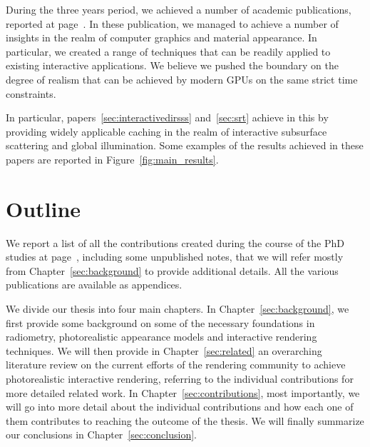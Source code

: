During the three years period, we achieved a number of academic publications, reported at page~\pageref{sec:contributionlist}. In these publication, we managed to achieve a number of insights in the realm of computer graphics and material appearance. In particular, we created a range of techniques that can be readily applied to existing interactive applications. We believe we pushed the boundary on the degree of realism that can be achieved by modern GPUs on the same strict time constraints. 

In particular, papers~\ref{sec:interactivedirsss} and~\ref{sec:srt} achieve in this by providing widely applicable caching in the realm of interactive subsurface scattering and global illumination. Some examples of the results achieved in these papers are reported in Figure~\ref{fig:main_results}.

\section{Outline}

We report a list of all the contributions created during the course of the PhD studies at page~\pageref{sec:contributionlist}, including some unpublished notes, that we will refer mostly from Chapter~\ref{sec:background} to provide additional details. All the various publications are available as appendices. 

We divide our thesis into four main chapters. In Chapter~\ref{sec:background}, we first provide some background on some of the necessary foundations in radiometry, photorealistic appearance models and interactive rendering techniques. We will then provide in Chapter~\ref{sec:related} an overarching literature review on the current efforts of the rendering community to achieve photorealistic interactive rendering, referring to the individual contributions for more detailed related work. In Chapter~\ref{sec:contributions}, most importantly, we will go into more detail about the individual contributions and how each one of them contributes to reaching the outcome of the thesis. We will finally summarize our conclusions in Chapter~\ref{sec:conclusion}. 
